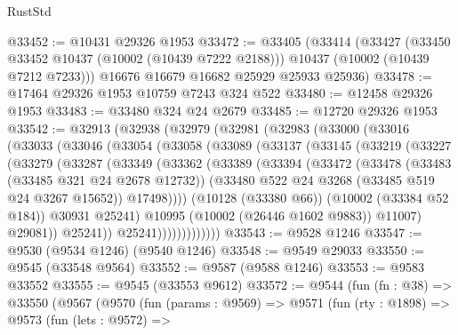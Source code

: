 \begin{lexlean}{RustStd}
\begin{coremodule}
@33452 := @10431 @29326 @1953
@33472 := @33405
    (@33414
      (@33427
        (@33450 @33452 @10437 (@10002 (@10439 @7222 @2188)))
        @10437
        (@10002 (@10439 @7212 @7233)))
      @16676
      @16679
      @16682
      @25929
      @25933
      @25936)
@33478 := @17464 @29326 @1953 @10759 @7243 @324 @522
@33480 := @12458 @29326 @1953
@33483 := @33480 @324 @24 @2679
@33485 := @12720 @29326 @1953
@33542 := @32913
    (@32938
      (@32979
        (@32981
          (@32983
            (@33000
              (@33016
                (@33033
                  (@33046
                    (@33054
                      (@33058
                        (@33089
                          (@33137
                            (@33145
                              (@33219
                                (@33227
                                  (@33279
                                    (@33287
                                      (@33349
                                        (@33362
                                          (@33389
                                            (@33394
                                              (@33472
                                                (@33478
                                                  (@33483 (@33485 @321 @24 @2678 @12732))
                                                  (@33480
                                                    @522
                                                    @24
                                                    @3268
                                                    (@33485 @519 @24 @3267 @15652))
                                                  @17498))))
                                          (@10128 (@33380 @66))
                                          (@10002 (@33384 @52 @184))
                                          @30931
                                          @25241)
                                        @10995
                                        (@10002 (@26446 @1602 @9883))
                                        @11007)
                                      @29081))
                                  @25241))
                              @25241)))))))))))))
@33543 := @9528 @1246
@33547 := @9530 (@9534 @1246) (@9540 @1246)
@33548 := @9549 @29033
@33550 := @9545 (@33548 @9564)
@33552 := @9587 (@9588 @1246)
@33553 := @9583 @33552
@33555 := @9545 (@33553 @9612)
@33572 := @9544
    (fun (fn : @38) =>
    @33550
      (@9567
        (@9570
          (fun (params : @9569) =>
          @9571
            (fun (rty : @1898) =>
            @9573
              (fun (lets : @9572) =>

\end{coremodule}
\end{lexlean}
